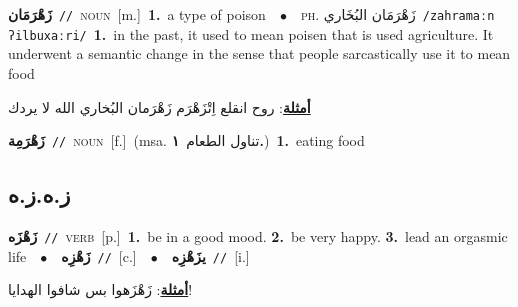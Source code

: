 \documentclass[10pt,a4paper,twoside]{article} %
\begin{document}
\begin{multicols}{2}
{\setlength\topsep{0pt}\textbf{\foreignlanguage{arabic}{زَهْرَمَان}}\ {\color{gray}\texttt{//}\color{black}}\ \textsc{noun}\ [m.]\ \textbf{1.}~a type of poison\ \ $\bullet$\ \ \textsc{ph.} \color{gray} \foreignlanguage{arabic}{زَهْرَمَان البُخَاري}\color{black}\ {\color{gray}\texttt{/{\sffamily zahramaːn ʔilbuxaːri}/}\color{black}}\ \textbf{1.}~in the past, it used to mean poisen that is used agriculture. It underwent a semantic change in the sense that people sarcastically use it to mean food\  \begin{flushright}\color{gray}\foreignlanguage{arabic}{\textbf{\underline{\foreignlanguage{arabic}{أمثلة}}}: روح انقلع اِتْزَهْرَم زَهْرَمان البُخاري الله لا يردك}\end{flushright}\color{black}} \vspace{2mm}

{\setlength\topsep{0pt}\textbf{\foreignlanguage{arabic}{زَهْرَمِة}}\ {\color{gray}\texttt{//}\color{black}}\ \textsc{noun}\ [f.]\ \color{gray}(msa. \foreignlanguage{arabic}{تناول الطعام}~\foreignlanguage{arabic}{\textbf{١.}})\color{black}\ \textbf{1.}~eating food\ } \vspace{2mm}

\vspace{-3mm}
\subsection*{\color{blue}\foreignlanguage{arabic}{ز.ه.ز.ه}\color{blue}{}} 

{\setlength\topsep{0pt}\textbf{\foreignlanguage{arabic}{زَهْزَه}}\ {\color{gray}\texttt{//}\color{black}}\ \textsc{verb}\ [p.]\ \textbf{1.}~be in a good mood.  \textbf{2.}~be very happy.  \textbf{3.}~lead an orgasmic life\ \ $\bullet$\ \ \setlength\topsep{0pt}\textbf{\foreignlanguage{arabic}{زَهْزِه}}\ {\color{gray}\texttt{//}\color{black}}\ [c.]\ \ $\bullet$\ \ \setlength\topsep{0pt}\textbf{\foreignlanguage{arabic}{يزَهْزِه}}\ {\color{gray}\texttt{//}\color{black}}\ [i.]\  \begin{flushright}\color{gray}\foreignlanguage{arabic}{\textbf{\underline{\foreignlanguage{arabic}{أمثلة}}}: زَهْزَهوا بس شافوا الهدايا!}\end{flushright}\color{black}} \vspace{2mm}


\end{multicols}
\end{document}
